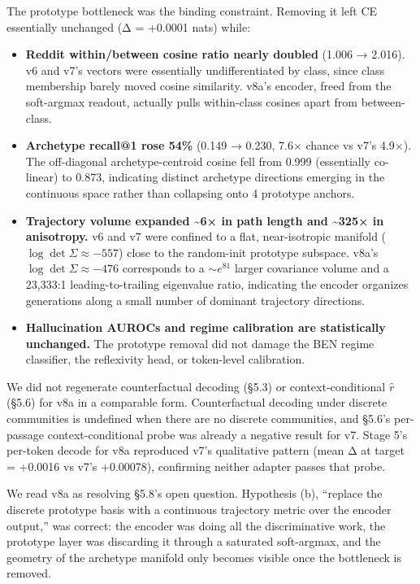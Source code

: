 \documentclass[
  11pt]{article}
\providecommand{\tightlist}{%
  \setlength{\itemsep}{0pt}\setlength{\parskip}{0pt}}
\begin{document}
The prototype bottleneck was the binding constraint. Removing it left CE
essentially unchanged (Δ = +0.0001 nats) while:

\begin{itemize}
\tightlist
\item
  \textbf{Reddit within/between cosine ratio nearly doubled} (1.006 →
  2.016). v6 and v7's vectors were essentially undifferentiated by
  class, since class membership barely moved cosine similarity. v8a's
  encoder, freed from the soft-argmax readout, actually pulls
  within-class cosines apart from between-class.
\item
  \textbf{Archetype recall@1 rose 54\%} (0.149 → 0.230, 7.6× chance vs
  v7's 4.9×). The off-diagonal archetype-centroid cosine fell from 0.999
  (essentially co-linear) to 0.873, indicating distinct archetype
  directions emerging in the continuous space rather than collapsing
  onto 4 prototype anchors.
\item
  \textbf{Trajectory volume expanded \textasciitilde6× in path length
  and \textasciitilde325× in anisotropy.} v6 and v7 were confined to a
  flat, near-isotropic manifold (\(\log\det\Sigma \approx -557\)) close
  to the random-init prototype subspace. v8a's
  \(\log\det\Sigma \approx -476\) corresponds to a \(\sim e^{81}\)
  larger covariance volume and a 23,333:1 leading-to-trailing eigenvalue
  ratio, indicating the encoder organizes generations along a small
  number of dominant trajectory directions.
\item
  \textbf{Hallucination AUROCs and regime calibration are statistically
  unchanged.} The prototype removal did not damage the BEN regime
  classifier, the reflexivity head, or token-level calibration.
\end{itemize}

We did not regenerate counterfactual decoding (§5.3) or
context-conditional \(\hat{r}\) (§5.6) for v8a in a comparable form.
Counterfactual decoding under discrete communities is undefined when
there are no discrete communities, and §5.6's per-passage
context-conditional probe was already a negative result for v7. Stage
5's per-token decode for v8a reproduced v7's qualitative pattern (mean Δ
at target = +0.0016 vs v7's +0.00078), confirming neither adapter passes
that probe.

We read v8a as resolving §5.8's open question. Hypothesis (b), ``replace
the discrete prototype basis with a continuous trajectory metric over
the encoder output,'' was correct: the encoder was doing all the
discriminative work, the prototype layer was discarding it through a
saturated soft-argmax, and the geometry of the archetype manifold only
becomes visible once the bottleneck is removed.
\end{document}
